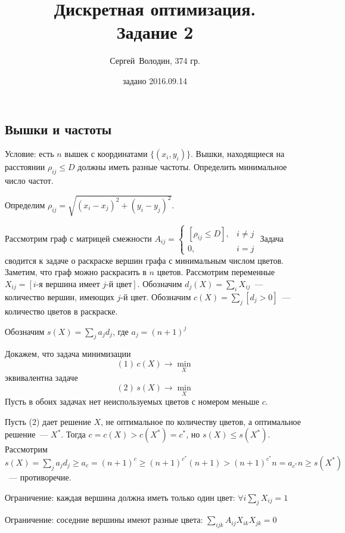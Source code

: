 \documentclass[a4paper]{article}
\title{Дискретная оптимизация.\\Задание 2}
\date{задано 2016.09.14}
\author{Сергей~Володин, 374 гр.}
\begin{document}
\maketitle

\subsection*{Вышки и частоты}
Условие: есть $n$ вышек с координатами $\{(x_i, y_i)\}$. Вышки, находящиеся на расстоянии $\rho_{ij}\leqslant D$ должны иметь разные частоты. Определить минимальное число частот.

Определим $\rho_{ij}=\sqrt{(x_i-x_j)^2+(y_i-y_j)^2}$.

Рассмотрим граф с матрицей смежности $A_{ij}=\begin{cases}
[\rho_{ij}\leqslant D],& i\neq j\\
0,& i=j
\end{cases}$
Задача сводится к задаче о раскраске вершин графа с минимальным числом цветов. Заметим, что граф можно раскрасить в $n$ цветов.
Рассмотрим переменные $X_{ij}=[i\mbox{-я вершина имеет }j\mbox{-й цвет}]$.
Обозначим $d_j(X)=\sum\limits_iX_{ij}$~--- количество вершин, имеющих $j$-й цвет.
Обозначим $c(X)=\sum\limits_{j}[d_j>0]$~--- количество цветов в раскраске.

Обозначим $s(X)=\sum\limits_j{a_jd_j}$, где $a_j=(n+1)^j$

Докажем, что задача минимизации
$$(1)\,c(X)\to\min\limits_X$$
эквивалентна задаче
$$(2)\,s(X)\to\min\limits_X$$
Пусть в обоих задачах нет неиспользуемых цветов с номером меньше $c$.

Пусть (2) дает решение $X$, не оптимальное по количеству цветов, а оптимальное решение~--- $X^*$. Тогда $c=c(X)>c(X^*)=c^*$, но $s(X)\leqslant s(X^*)$.
Рассмотрим $s(X)=\sum_j a_jd_j \geqslant a_c=(n+1)^c\geqslant (n+1)^{c^*}(n+1)>(n+1)^{c^*}n=a_{c^*}n\geqslant 
s(X^*)$~--- противоречие.

Ограничение: каждая вершина должна иметь только один цвет: $\forall i \sum\limits_j X_{ij}=1$

Ограничение: соседние вершины имеют разные цвета: $\sum\limits_{ijk}A_{ij}X_{ik}X_{jk}=0$
\end{document}
